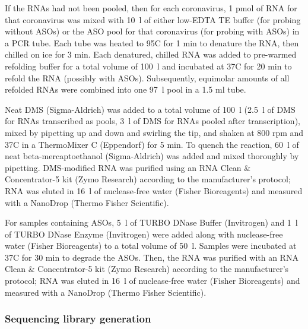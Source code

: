 \documentclass[main.tex]{subfiles}
\begin{document}
If the RNAs had not been pooled, then for each coronavirus, 1 pmol of RNA for that coronavirus was mixed with 10~\textmu l of either low-EDTA TE buffer (for probing without ASOs) or the ASO pool for that coronavirus (for probing with ASOs) in a PCR tube.
Each tube was heated to 95\textdegree C for 1 min to denature the RNA, then chilled on ice for 3 min.
Each denatured, chilled RNA was added to pre-warmed refolding buffer for a total volume of 100~\textmu l and incubated at 37\textdegree C for 20 min to refold the RNA (possibly with ASOs).
Subsequently, equimolar amounts of all refolded RNAs were combined into one 97~\textmu l pool in a 1.5 ml tube.

Neat DMS (Sigma-Aldrich) was added to a total volume of 100~\textmu l (2.5~\textmu l of DMS for RNAs transcribed as pools, 3~\textmu l of DMS for RNAs pooled after transcription), mixed by pipetting up and down and swirling the tip, and shaken at 800 rpm and 37\textdegree C in a ThermoMixer C (Eppendorf) for 5 min.
To quench the reaction, 60~\textmu l of neat beta-mercaptoethanol (Sigma-Aldrich) was added and mixed thoroughly by pipetting.
DMS-modified RNA was purified using an RNA Clean \& Concentrator-5 kit (Zymo Research) according to the manufacturer's protocol; RNA was eluted in 16~\textmu l of nuclease-free water (Fisher Bioreagents) and measured with a NanoDrop (Thermo Fisher Scientific).

For samples containing ASOs, 5~\textmu l of TURBO DNase Buffer (Invitrogen) and 1~\textmu l of TURBO DNase Enzyme (Invitrogen) were added along with nuclease-free water (Fisher Bioreagents) to a total volume of 50~\textmu l.
Samples were incubated at 37\textdegree C for 30 min to degrade the ASOs.
Then, the RNA was purified with an RNA Clean \& Concentrator-5 kit (Zymo Research) according to the manufacturer's protocol; RNA was eluted in 16~\textmu l of nuclease-free water (Fisher Bioreagents) and measured with a NanoDrop (Thermo Fisher Scientific).

\subsubsection{Sequencing library generation}
\end{document}
